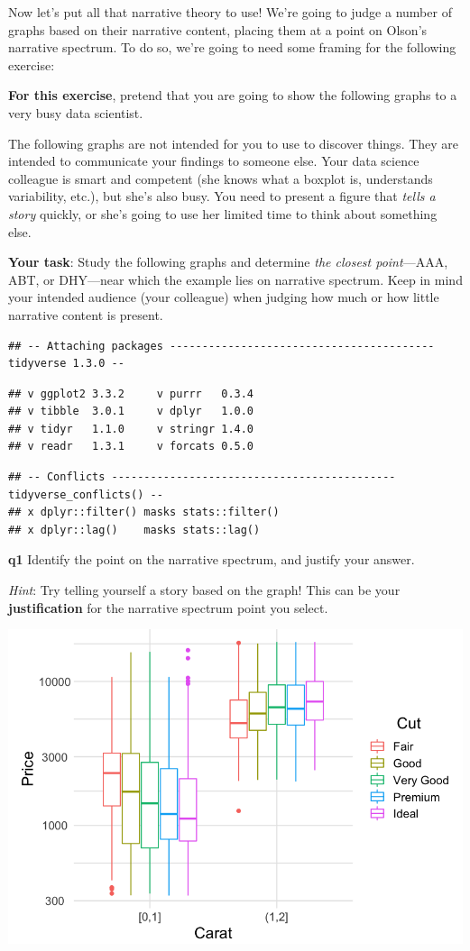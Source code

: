\documentclass[
]{article}
\begin{document}
Now let's put all that narrative theory to use! We're going to judge a
number of graphs based on their narrative content, placing them at a
point on Olson's narrative spectrum. To do so, we're going to need some
framing for the following exercise:

\textbf{For this exercise}, pretend that you are going to show the
following graphs to a very busy data scientist.

The following graphs are not intended for you to use to discover things.
They are intended to communicate your findings to someone else. Your
data science colleague is smart and competent (she knows what a boxplot
is, understands variability, etc.), but she's also busy. You need to
present a figure that \emph{tells a story} quickly, or she's going to
use her limited time to think about something else.

\textbf{Your task}: Study the following graphs and determine \emph{the
closest point}---AAA, ABT, or DHY---near which the example lies on
narrative spectrum. Keep in mind your intended audience (your colleague)
when judging how much or how little narrative content is present.

\begin{verbatim}
## -- Attaching packages ----------------------------------------- tidyverse 1.3.0 --
\end{verbatim}

\begin{verbatim}
## v ggplot2 3.3.2     v purrr   0.3.4
## v tibble  3.0.1     v dplyr   1.0.0
## v tidyr   1.1.0     v stringr 1.4.0
## v readr   1.3.1     v forcats 0.5.0
\end{verbatim}

\begin{verbatim}
## -- Conflicts -------------------------------------------- tidyverse_conflicts() --
## x dplyr::filter() masks stats::filter()
## x dplyr::lag()    masks stats::lag()
\end{verbatim}

\textbf{q1} Identify the point on the narrative spectrum, and justify
your answer.

\emph{Hint}: Try telling yourself a story based on the graph! This can
be your \textbf{justification} for the narrative spectrum point you
select.

\includegraphics{e-comm01-story-basics_files/figure-latex/q1-vis-1.png}
\end{document}
